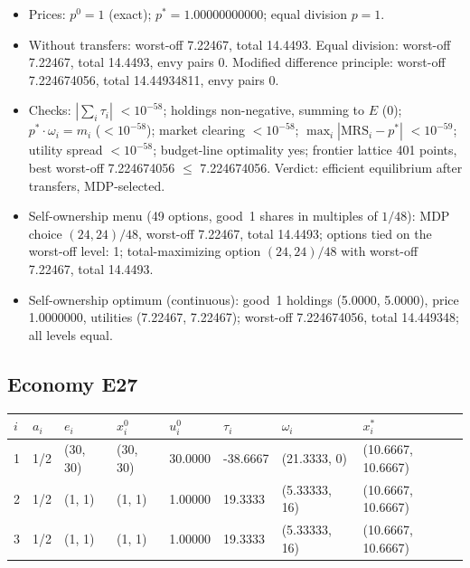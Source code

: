 \begin{itemize}[leftmargin=1.2em,itemsep=0pt,topsep=2pt]\footnotesize
\item Prices: $p^0 = 1$ (exact); $p^* = 1.00000000000$; equal division $p = 1$.
\item Without transfers: worst-off 7.22467, total 14.4493. Equal division: worst-off 7.22467, total 14.4493, envy pairs 0. Modified difference principle: worst-off 7.224674056, total 14.44934811, envy pairs 0.
\item Checks: $|\sum_i\tau_i|$ $<10^{-58}$; holdings non-negative, summing to $E$ (0); $p^*\cdot\omega_i = m_i$ ($<10^{-58}$); market clearing $<10^{-58}$; $\max_i|\mathrm{MRS}_i - p^*|$ $<10^{-59}$; utility spread $<10^{-58}$; budget-line optimality yes; frontier lattice 401 points, best worst-off 7.224674056 $\leq$ 7.224674056. Verdict: efficient equilibrium after transfers, MDP-selected.
\item Self-ownership menu (49 options, good~1 shares in multiples of $1/48$): MDP choice $(24, 24)/48$, worst-off 7.22467, total 14.4493; options tied on the worst-off level: 1; total-maximizing option $(24, 24)/48$ with worst-off 7.22467, total 14.4493.
\item Self-ownership optimum (continuous): good~1 holdings (5.0000, 5.0000), price 1.0000000, utilities (7.22467, 7.22467); worst-off 7.224674056, total 14.449348; all levels equal.
\end{itemize}

\subsection*{Economy E27}
\label{ec:E27}
{\scriptsize\setlength{\tabcolsep}{3pt}
\begin{tabular}{@{}llllllll@{}}
\toprule
$i$ & $a_i$ & $e_i$ & $x^0_i$ & $u^0_i$ & $\tau_i$ & $\omega_i$ & $x^*_i$ \\
\midrule
1 & 1/2 & (30, 30) & (30, 30) & 30.0000 & -38.6667 & (21.3333, 0) & (10.6667, 10.6667) \\
2 & 1/2 & (1, 1) & (1, 1) & 1.00000 & 19.3333 & (5.33333, 16) & (10.6667, 10.6667) \\
3 & 1/2 & (1, 1) & (1, 1) & 1.00000 & 19.3333 & (5.33333, 16) & (10.6667, 10.6667) \\
\bottomrule\end{tabular}}

